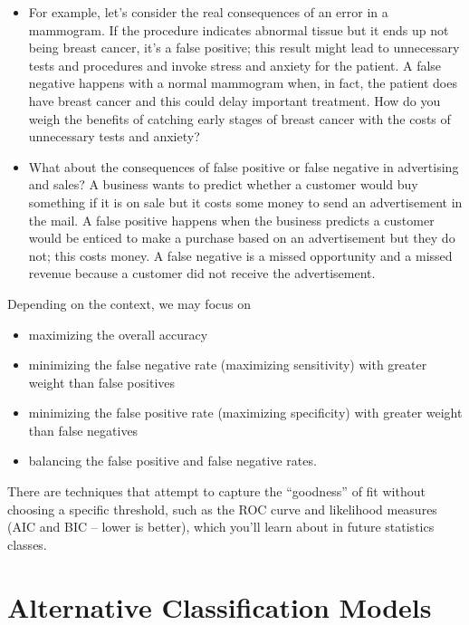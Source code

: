 \documentclass[
]{book}
\providecommand{\tightlist}{%
  \setlength{\itemsep}{0pt}\setlength{\parskip}{0pt}}
\begin{document}
\begin{itemize}
\item
  For example, let's consider the real consequences of an error in a mammogram. If the procedure indicates abnormal tissue but it ends up not being breast cancer, it's a false positive; this result might lead to unnecessary tests and procedures and invoke stress and anxiety for the patient. A false negative happens with a normal mammogram when, in fact, the patient does have breast cancer and this could delay important treatment. How do you weigh the benefits of catching early stages of breast cancer with the costs of unnecessary tests and anxiety?
\item
  What about the consequences of false positive or false negative in advertising and sales? A business wants to predict whether a customer would buy something if it is on sale but it costs some money to send an advertisement in the mail. A false positive happens when the business predicts a customer would be enticed to make a purchase based on an advertisement but they do not; this costs money. A false negative is a missed opportunity and a missed revenue because a customer did not receive the advertisement.
\end{itemize}

Depending on the context, we may focus on

\begin{itemize}
\tightlist
\item
  maximizing the overall accuracy
\item
  minimizing the false negative rate (maximizing sensitivity) with greater weight than false positives
\item
  minimizing the false positive rate (maximizing specificity) with greater weight than false negatives
\item
  balancing the false positive and false negative rates.
\end{itemize}

There are techniques that attempt to capture the ``goodness'' of fit without choosing a specific threshold, such as the ROC curve and likelihood measures (AIC and BIC -- lower is better), which you'll learn about in future statistics classes.

\section{Alternative Classification Models}\label{alternative-classification-models}
\end{document}
